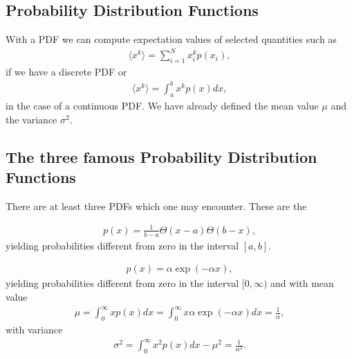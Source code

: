 \documentclass[letterpaper,10pt,english]{sphinxmanual}
\begin{document}
\subsection{Probability Distribution Functions}
\label{\detokenize{chapter2:id1}}
With a PDF we can compute expectation values of selected quantities such as
\begin{equation*}
\begin{split}
\langle x^k\rangle=\sum_{i=1}^{N}x_i^kp(x_i),
\end{split}
\end{equation*}
if we have a discrete PDF or
\begin{equation*}
\begin{split}
\langle x^k\rangle=\int_a^b x^kp(x)dx,
\end{split}
\end{equation*}
in the case of a continuous PDF. We have already defined the mean value \(\mu\)
and the variance \(\sigma^2\).


\subsection{The three famous Probability Distribution Functions}
\label{\detokenize{chapter2:the-three-famous-probability-distribution-functions}}
There are at least three PDFs which one may encounter. These are the

\begin{equation*}
\begin{split}
p(x)=\frac{1}{b-a}\Theta(x-a)\Theta(b-x),
\end{split}
\end{equation*}
yielding probabilities different from zero in the interval \([a,b]\).

\begin{equation*}
\begin{split}
p(x)=\alpha \exp{(-\alpha x)},
\end{split}
\end{equation*}
yielding probabilities different from zero in the interval \([0,\infty)\) and with mean value
\begin{equation*}
\begin{split}
\mu = \int_0^{\infty}xp(x)dx=\int_0^{\infty}x\alpha \exp{(-\alpha x)}dx=\frac{1}{\alpha},
\end{split}
\end{equation*}
with variance
\begin{equation*}
\begin{split}
\sigma^2=\int_0^{\infty}x^2p(x)dx-\mu^2 = \frac{1}{\alpha^2}.
\end{split}
\end{equation*}
\end{document}
